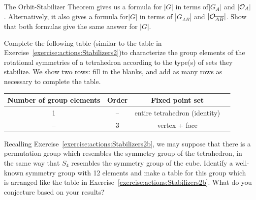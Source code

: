 \begin{exercise}\label{exercise:actions:Tetra8}
The Orbit-Stabilizer Theorem gives us a formula for $|G|$ in terms of$| G_{A}|$ and $|{\cal O}_{A}|$. Alternatively, it also gives a formula for$|G|$ in terms of  $| G_{\overline{AB}}|$ and $|{\cal O}_{\overline{AB}}|$. Show that both formulas give the same answer for $|G|$.
\end{exercise}

\begin{exercise}\label{exercise:actions:Tetra9}
Complete the following table (similar to the table in Exercise~\ref{exercise:actions:Stabilizers2})to characterize the group elements of the rotational symmetries of a tetrahedron according to the type(s) of sets they stabilize.  We show two rows: fill in the blanks, and add as many rows as necessary to complete the table.
  
\begin{tabular}{| c |c|c| r |} \hline
 \textbf{ Number of group elements} & \textbf{Order} & \textbf{Fixed point set} \\ \hline
  1&  --& entire tetrahedron (identity) \\ \hline
  -- & 3& vertex + face \\   
\end{tabular}

\end{exercise}
\begin{exercise}
Recalling Exercise~\ref{exercise:actions:Stabilizers2b}, we may suppose that there is a permutation group which resembles the symmetry group of the tetrahedron, in the same way that $S_4$ resembles the symmetry group of the cube. Identify a well-known symmetry group with 12 elements and  make a table for this group which is arranged like the table in Exercise~\ref{exercise:actions:Stabilizers2b}. What do you conjecture based on your results?
\end{exercise}
